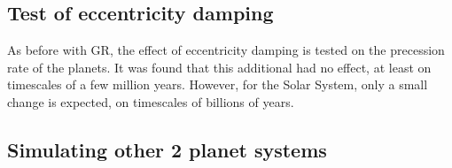 \documentclass[11pt, oneside]{article}   	%
\begin{document}
\subsection{Test of eccentricity damping}

As before with GR, the effect of eccentricity damping is tested on the precession rate of the planets. It was found that this additional had no effect, at least on timescales of a few million years. However, for the Solar System, only a small change is expected, on timescales of billions of years.

\subsection{Simulating other 2 planet systems}


\newpage



 

\end{document}
